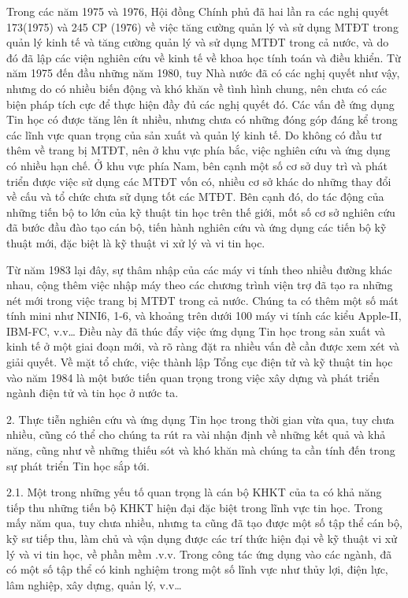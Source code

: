 \documentclass[11pt, a4paper, reqno, oneside]{book}
\begin{document}
Trong các năm 1975 và 1976, Hội đồng Chính phủ đã hai lần ra các nghị quyết 173(1975) và 245 CP (1976) về việc tăng cường quản lý và sử dụng MTĐT trong quản lý kinh tế và tăng cường quản lý và sử dụng MTĐT trong cả nước, và do đó đã lập các viện nghiên cứu về kinh tế về khoa học tính toán và điều khiển. Từ năm 1975 đến đầu những năm 1980, tuy Nhà nước đã có các nghị quyết như vậy, nhưng do có nhiều biến động và khó khăn về tình hình chung, nên chưa có các biện pháp tích cực để thực hiện đầy đủ các nghị quyết đó. Các vấn đề ứng dụng Tin học có được tăng lên ít nhiều, nhưng chưa có những đóng góp đáng kể trong các lĩnh vực quan trọng của sản xuất và quản lý kinh tế. Do không có đầu tư thêm về trang bị MTĐT, nên ở khu vực phía bắc, việc nghiên cứu và ứng dụng có nhiều hạn chế. Ở khu vực phía Nam, bên cạnh một số cơ sở duy trì và phát triển được việc sử dụng các MTĐT vốn có, nhiều cơ sở khác do những thay đổi về cấu và tổ chức chưa sử dụng tốt các MTĐT. Bên cạnh đó, do tác động của những tiến bộ to lớn của kỹ thuật tin học trên thế giới, mốt số cơ sở nghiên cứu đã bước đầu đào tạo cán bộ, tiến hành nghiên cứu và ứng dụng các tiến bộ kỹ thuật mới, đặc biệt là kỹ thuật vi xử lý và vi tin học.


 Từ năm 1983 lại đây, sự thâm nhập của các máy vi tính theo nhiều đường khác nhau, cộng thêm việc nhập máy theo các chương trình viện trợ đã tạo ra những nét mới trong việc trang bị MTĐT trong cả nước. Chúng ta có thêm một số mát tính mini như NINI6, 1-6, và khoảng trên dưới 100 máy vi tính các kiểu Apple-II, IBM-FC, v.v… Điều này đã thúc đẩy việc ứng dụng Tin học trong sản xuất và kinh tế ở một giai đoạn mới, và rõ ràng đặt ra nhiều vấn đề cần được xem xét và giải quyết. Về mặt tổ chức, việc thành lập Tổng cục điện tử và kỹ thuật tin học vào năm 1984 là một bước tiến quan trọng trong việc xây dựng và phát triển ngành điện tử và tin học ở nước ta.
 
 
2.	Thực tiễn nghiên cứu và ứng dụng Tin học trong thời gian vừa qua, tuy chưa nhiều, cũng có thể cho chúng ta rút ra vài nhận định về những kết quả và khả năng, cũng như về những thiếu sót và khó khăn mà chúng ta cần tính đến trong sự phát triển Tin học sắp tới.


2.1.	 Một trong những yếu tố quan trọng là cán bộ KHKT của ta có khả năng tiếp thu những tiến bộ KHKT hiện đại đặc biệt trong lĩnh vực tin học. Trong mấy năm qua, tuy chưa nhiều, nhưng ta cũng đã tạo được một số tập thể cán bộ, kỹ sư tiếp thu, làm chủ và vận dụng được các trí thức hiện đại về kỹ thuật vi xử lý và vi tin học, về phần mềm .v.v. Trong công tác ứng dụng vào các ngành, đã có một số tập thể có kinh nghiệm trong một số lĩnh vực như thủy lợi, điện lực, lâm nghiệp, xây dựng, quản lý, v.v…
\end{document}
